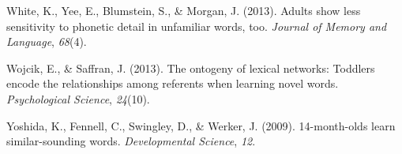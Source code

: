 \documentclass[10pt, letterpaper]{article}
\begin{document}
\hypertarget{ref-white2013}{}
White, K., Yee, E., Blumstein, S., \& Morgan, J. (2013). Adults show
less sensitivity to phonetic detail in unfamiliar words, too.
\emph{Journal of Memory and Language}, \emph{68}(4).

\hypertarget{ref-wojcik2013}{}
Wojcik, E., \& Saffran, J. (2013). The ontogeny of lexical networks:
Toddlers encode the relationships among referents when learning novel
words. \emph{Psychological Science}, \emph{24}(10).

\hypertarget{ref-yoshida2009}{}
Yoshida, K., Fennell, C., Swingley, D., \& Werker, J. (2009).
14-month-olds learn similar-sounding words. \emph{Developmental
Science}, \emph{12}.
\end{document}
